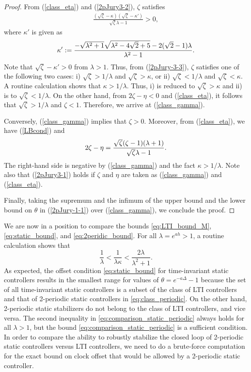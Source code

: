 \documentclass[letterpaper, 12pt, draftcls, onecolumn]{ieeeconf}
\begin{document}
\begin{proof}
From (\ref{class_eta}) and (\ref{2pJury3-2}), $\zeta$ satisfies
\begin{align}
\frac{(\sqrt{\zeta}-\kappa)(\sqrt{\zeta}-\kappa')}
{\sqrt{\zeta}\lambda-1}>0,
\label{2pJury-3-3}
\end{align}
where $\kappa'$ is given as
\begin{align}
\kappa':=\frac{-\sqrt{\lambda^2+1}\sqrt{\lambda^2-4\sqrt{2}+5}-
	2(\sqrt{2}-1)\lambda}{\lambda^2-1}.
\notag
\end{align}
Note that $\sqrt{\zeta}-\kappa'>0$ from $\lambda > 1$.
Thus, from (\ref{2pJury-3-3}), $\zeta$ satisfies one of the following two cases:
i) $\sqrt{\zeta}>1/\lambda$ and $\sqrt{\zeta}>\kappa$, or
ii) $\sqrt{\zeta}<1/\lambda$ and $\sqrt{\zeta}<\kappa$.
A routine calculation shows that $\kappa>1/\lambda$.
Thus, i) is reduced to $\sqrt{\zeta}>\kappa$ and ii) is 
to $\sqrt{\zeta}<1/\lambda$.
On the other hand, from $2\zeta-\eta<0$ and (\ref{class_eta}), it follows that
$\sqrt{\zeta}>1/\lambda$ and $\zeta<1$.
Therefore, we arrive at (\ref{class_gamma}). 


Conversely, (\ref{class_gamma}) implies that $\zeta>0$.
Moreover, from (\ref{class_eta}), we have (\ref{LBcond}) and
\begin{align}
2\zeta-\eta
=\frac{\sqrt{\zeta}(\zeta-1)(\lambda+1)}
{\sqrt{\zeta}\lambda-1}.\notag
\end{align}
The right-hand side is negative by (\ref{class_gamma}) and the fact
$\kappa>1/\lambda$.
Note also that (\ref{2pJury3-1}) holds if $\zeta$ and $\eta$ are taken as
(\ref{class_gamma}) and (\ref{class_eta}).

Finally, taking the supremum and the infimum of the upper bound and the lower
bound on $\theta$ in (\ref{2pJury-1-1}) over (\ref{class_gamma}), we conclude
the proof.
\end{proof}


We are now in a position to compare the bounds
\eqref{eq:LTI_bound_M}, \eqref{eq:static_bound}, and
\eqref{eq:2peridic_bound}.
For all $\lambda = e^{ah} > 1$, a routine calculation shows that 
\begin{equation}
\label{eq:comparison_static_periodic}
\frac{1}{\lambda} < \frac{1}{\lambda\kappa} < \frac{2\lambda}{\lambda^2+1}.
\end{equation}
As expected, the offset condition \eqref{eq:static_bound}
for time-invariant static controllers 
results in the smallest range for values of $\theta = 
e^{-a\Delta} - 1$
because the set of all time-invariant static controllers
is a subset of the class of LTI controllers and 
that of 2-periodic static controllers in \eqref{eq:class_periodic}.
On the other hand,
2-periodic static stabilizers do not belong to the class of LTI controllers,
and vice versa.
The second inequality in \eqref{eq:comparison_static_periodic}
always holds for all $\lambda  > 1$, but the bound \eqref{eq:comparison_static_periodic}
is a sufficient condition.
In order to compare 
the ability to robustly stabilize the closed loop of
2-periodic static controllers versus
LTI controllers, we need to do a brute-force computation for 
the exact bound on clock offset that would be allowed by
a 2-periodic static controller. 
\end{document}
